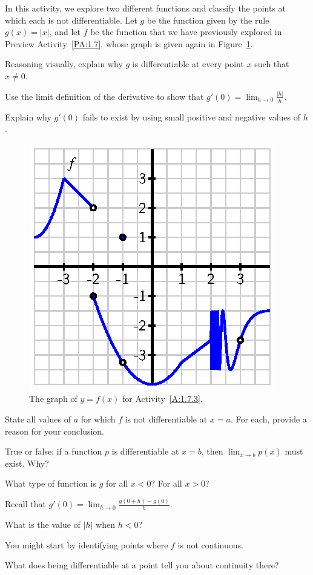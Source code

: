 \begin{activity} \label{A:1.7.3} 
In this activity, we explore two different functions and classify the points at which each is not differentiable.  Let $g$ be the function given by the rule $g(x) = |x|$, and let $f$ be the function that we have previously explored in Preview Activity~\ref{PA:1.7}, whose graph is given again in Figure~\ref{F:1.7.Act3}.
\ba
	\item Reasoning visually, explain why $g$ is differentiable at every point $x$ such that $x \ne 0$.
	\item Use the limit definition of the derivative to show that $g'(0) = \lim_{h \to 0} \frac{|h|}{h}.$
	\item Explain why $g'(0)$ fails to exist by using small positive and negative values of $h$.
\begin{figure}[h]
\begin{center}
\includegraphics{figures/1_7_PA1.eps}
\caption{The graph of $y = f(x)$ for Activity~\ref{A:1.7.3}.} \label{F:1.7.Act3}
\end{center}
\end{figure}
	\item State all values of $a$ for which $f$ is not differentiable at $x = a$.  For each, provide a reason for your conclusion.
	\item True or false: if a function $p$ is differentiable at $x = b$, then $\lim_{x \to b} p(x)$ must exist.  Why?	
\ea

\end{activity}
\begin{smallhint}
\ba
	\item What type of function is $g$ for all $x < 0$?  For all $x > 0$?
	\item Recall that $g'(0) = \lim_{h \to 0} \frac{g(0 + h) - g(0)}{h}.$
	\item What is the value of $|h|$ when $h < 0$?
	\item You might start by identifying points where $f$ is not continuous.
	\item What does being differentiable at a point tell you about continuity there?	
\ea
\end{smallhint}
